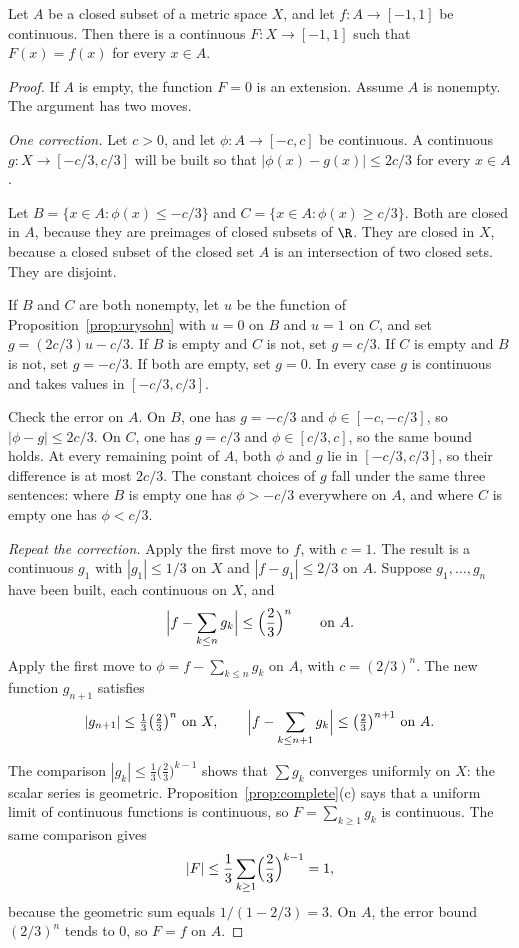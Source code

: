\begin{proposition}\label{prop:tietze}
Let $A$ be a closed subset of a metric space $X$, and let $f:A\to[-1,1]$ be continuous. Then there is a continuous $F:X\to[-1,1]$ such that $F(x)=f(x)$ for every $x\in A$.
\end{proposition}
\begin{proof}
If $A$ is empty, the function $F=0$ is an extension. Assume $A$ is nonempty. The argument has two moves.

\emph{One correction.} Let $c>0$, and let $\phi:A\to[-c,c]$ be continuous. A continuous $g:X\to[-c/3,c/3]$ will be built so that $|\phi(x)-g(x)|\le 2c/3$ for every $x\in A$.

Let $B=\{x\in A:\phi(x)\le -c/3\}$ and $C=\{x\in A:\phi(x)\ge c/3\}$. Both are closed in $A$, because they are preimages of closed subsets of $\R$. They are closed in $X$, because a closed subset of the closed set $A$ is an intersection of two closed sets. They are disjoint.

If $B$ and $C$ are both nonempty, let $u$ be the function of Proposition~\ref{prop:urysohn} with $u=0$ on $B$ and $u=1$ on $C$, and set $g=(2c/3)u-c/3$. If $B$ is empty and $C$ is not, set $g=c/3$. If $C$ is empty and $B$ is not, set $g=-c/3$. If both are empty, set $g=0$. In every case $g$ is continuous and takes values in $[-c/3,c/3]$.

Check the error on $A$. On $B$, one has $g=-c/3$ and $\phi\in[-c,-c/3]$, so $|\phi-g|\le 2c/3$. On $C$, one has $g=c/3$ and $\phi\in[c/3,c]$, so the same bound holds. At every remaining point of $A$, both $\phi$ and $g$ lie in $[-c/3,c/3]$, so their difference is at most $2c/3$. The constant choices of $g$ fall under the same three sentences: where $B$ is empty one has $\phi>-c/3$ everywhere on $A$, and where $C$ is empty one has $\phi<c/3$.

\emph{Repeat the correction.} Apply the first move to $f$, with $c=1$. The result is a continuous $g_1$ with $|g_1|\le 1/3$ on $X$ and $|f-g_1|\le 2/3$ on $A$. Suppose $g_1,\ldots,g_n$ have been built, each continuous on $X$, and
\[
\Bigl|f-\sum_{k\le n}g_k\Bigr|\le\Bigl(\frac23\Bigr)^n\qquad\text{on }A.
\]
Apply the first move to $\phi=f-\sum_{k\le n}g_k$ on $A$, with $c=(2/3)^n$. The new function $g_{n+1}$ satisfies
\[|g_{n+1}|\le\tfrac13\bigl(\tfrac23\bigr)^n\ \text{on }X,\qquad\Bigl|f-\sum_{k\le n+1}g_k\Bigr|\le\bigl(\tfrac23\bigr)^{n+1}\ \text{on }A.\]

The comparison $|g_k|\le\frac13\bigl(\frac23\bigr)^{k-1}$ shows that $\sum g_k$ converges uniformly on $X$: the scalar series is geometric. Proposition~\ref{prop:complete}(c) says that a uniform limit of continuous functions is continuous, so $F=\sum_{k\ge1}g_k$ is continuous. The same comparison gives
\[
|F|\le\frac13\sum_{k\ge1}\Bigl(\frac23\Bigr)^{k-1}=1,
\]
because the geometric sum equals $1/(1-2/3)=3$. On $A$, the error bound $(2/3)^n$ tends to $0$, so $F=f$ on $A$.
\end{proof}

